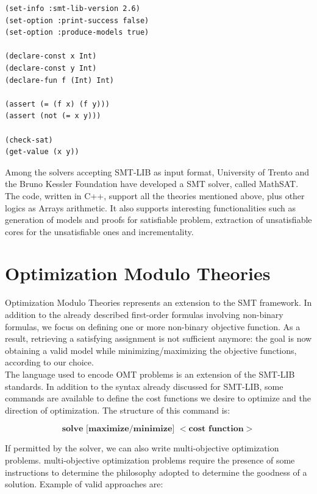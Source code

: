 \begin{lstlisting}[style=interfaces,caption=An example of SMT-LIB encoding.]
(set-info :smt-lib-version 2.6)
(set-option :print-success false)
(set-option :produce-models true)

(declare-const x Int)
(declare-const y Int)
(declare-fun f (Int) Int)

(assert (= (f x) (f y)))
(assert (not (= x y)))

(check-sat)
(get-value (x y))
\end{lstlisting}
Among the solvers accepting SMT-LIB as input format, University of Trento and the Bruno Kessler Foundation have developed a SMT solver, called MathSAT. The code, written in C++, support all the theories mentioned above, plus other logics as Arrays arithmetic. It also supports interesting functionalities such as generation of models and proofs for satisfiable problem, extraction of unsatisfiable cores for the unsatisfiable ones and incrementality.


\section{Optimization Modulo Theories}

Optimization Modulo Theories represents an extension to the SMT framework. In addition to the already described first-order formulas involving non-binary formulas, we focus on defining one or more non-binary objective function. As a result, retrieving a satisfying assignment is not sufficient anymore: the goal is now obtaining a valid model while minimizing/maximizing the objective functions, according to our choice.\\
The language used to encode OMT problems is an extension of the SMT-LIB standards. In addition to the syntax already discussed for SMT-LIB, some commands are available to define the cost functions we desire to optimize and the direction of optimization. The structure of this command is:

\begin{equation*}
    \textbf{solve [maximize/minimize] $<$cost function$>$}
\end{equation*}

If permitted by the solver, we can also write multi-objective optimization problems. multi-objective optimization problems  require the presence of some instructions to determine the philosophy adopted to determine the goodness of a solution. Example of valid approaches are:

